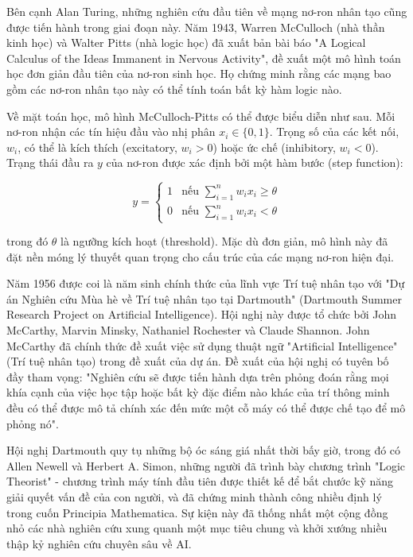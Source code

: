 \documentclass[12pt,a4paper]{article}
\begin{document}
Bên cạnh Alan Turing, những nghiên cứu đầu tiên về mạng nơ-ron nhân tạo cũng được tiến hành trong giai đoạn này. Năm 1943, Warren McCulloch (nhà thần kinh học) và Walter Pitts (nhà logic học) đã xuất bản bài báo "A Logical Calculus of the Ideas Immanent in Nervous Activity", đề xuất một mô hình toán học đơn giản đầu tiên của nơ-ron sinh học. Họ chứng minh rằng các mạng bao gồm các nơ-ron nhân tạo này có thể tính toán bất kỳ hàm logic nào. 

Về mặt toán học, mô hình McCulloch-Pitts có thể được biểu diễn như sau. Mỗi nơ-ron nhận các tín hiệu đầu vào nhị phân $x_i \in \{0, 1\}$. Trọng số của các kết nối, $w_i$, có thể là kích thích (excitatory, $w_i > 0$) hoặc ức chế (inhibitory, $w_i < 0$). Trạng thái đầu ra $y$ của nơ-ron được xác định bởi một hàm bước (step function):

\begin{equation}
y = \begin{cases} 
1 & \text{nếu } \sum_{i=1}^{n} w_i x_i \geq \theta \\
0 & \text{nếu } \sum_{i=1}^{n} w_i x_i < \theta 
\end{cases}
\end{equation}

trong đó $\theta$ là ngưỡng kích hoạt (threshold). Mặc dù đơn giản, mô hình này đã đặt nền móng lý thuyết quan trọng cho cấu trúc của các mạng nơ-ron hiện đại.

Năm 1956 được coi là năm sinh chính thức của lĩnh vực Trí tuệ nhân tạo với "Dự án Nghiên cứu Mùa hè về Trí tuệ nhân tạo tại Dartmouth" (Dartmouth Summer Research Project on Artificial Intelligence). Hội nghị này được tổ chức bởi John McCarthy, Marvin Minsky, Nathaniel Rochester và Claude Shannon. John McCarthy đã chính thức đề xuất việc sử dụng thuật ngữ "Artificial Intelligence" (Trí tuệ nhân tạo) trong đề xuất của dự án. Đề xuất của hội nghị có tuyên bố đầy tham vọng: "Nghiên cứu sẽ được tiến hành dựa trên phỏng đoán rằng mọi khía cạnh của việc học tập hoặc bất kỳ đặc điểm nào khác của trí thông minh đều có thể được mô tả chính xác đến mức một cỗ máy có thể được chế tạo để mô phỏng nó". 

Hội nghị Dartmouth quy tụ những bộ óc sáng giá nhất thời bấy giờ, trong đó có Allen Newell và Herbert A. Simon, những người đã trình bày chương trình "Logic Theorist" - chương trình máy tính đầu tiên được thiết kế để bắt chước kỹ năng giải quyết vấn đề của con người, và đã chứng minh thành công nhiều định lý trong cuốn Principia Mathematica. Sự kiện này đã thống nhất một cộng đồng nhỏ các nhà nghiên cứu xung quanh một mục tiêu chung và khởi xướng nhiều thập kỷ nghiên cứu chuyên sâu về AI.
\end{document}
